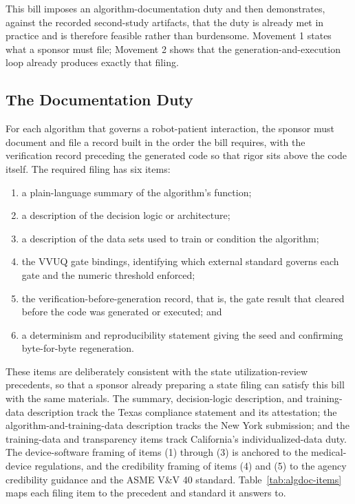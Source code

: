 
This bill imposes an algorithm-documentation duty and then demonstrates, against
the recorded second-study artifacts, that the duty is already met in practice and
is therefore feasible rather than burdensome. Movement 1 states what a sponsor
must file; Movement 2 shows that the generation-and-execution loop already
produces exactly that filing.

\clearpage

\subsection{The Documentation Duty}

For each algorithm that governs a robot-patient interaction, the sponsor must
document and file a record built in the order the bill requires, with the
verification record preceding the generated code so that rigor sits above the
code itself. The required filing has six items:

\begin{enumerate}[label=(\arabic*)]
\item a plain-language summary of the algorithm's function;
\item a description of the decision logic or architecture;
\item a description of the data sets used to train or condition the algorithm;
\item the VVUQ gate bindings, identifying which external standard governs each
gate and the numeric threshold enforced;
\item the verification-before-generation record, that is, the gate result that
cleared before the code was generated or executed; and
\item a determinism and reproducibility statement giving the seed and confirming
byte-for-byte regeneration.
\end{enumerate}

These items are deliberately consistent with the state utilization-review
precedents, so that a sponsor already preparing a state filing can satisfy this
bill with the same materials. The summary, decision-logic description, and
training-data description track the Texas compliance statement and its
attestation; the algorithm-and-training-data description tracks the New York
submission; and the training-data and transparency items track California's
individualized-data duty. The device-software framing of items (1) through (3) is
anchored to the medical-device regulations, and the credibility framing of items
(4) and (5) to the agency credibility guidance and the ASME V\&V 40 standard.
Table~\ref{tab:algdoc-items} maps each filing item to the precedent and standard
it answers to.

